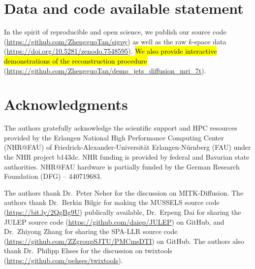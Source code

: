 \documentclass[preprint,12pt,authoryear,review]{elsarticle}
\begin{document}
    \section*{Data and code available statement}

    In the spirit of reproducible and open science,
    we publish our source code
    (\url{https://github.com/ZhengguoTan/sigpy})
    as well as the raw $k$-space data
    (\url{https://doi.org/10.5281/zenodo.7548595}).
    \hl{We also provide interactive demonstrations
    of the reconstruction procedure}
    (\url{https://github.com/ZhengguoTan/demo_jets_diffusion_mri_7t}).

    \section*{Acknowledgments}
        The authors gratefully acknowledge the scientific support and HPC resources
        provided by the Erlangen National High Performance Computing Center (NHR@FAU)
        of Friedrich-Alexander-Universit\"at Erlangen-N\"urnberg (FAU)
        under the NHR project b143dc.
        NHR funding is provided by federal and Bavarian state authorities.
        NHR@FAU hardware is partially funded by the German Research Foundation (DFG) -- 440719683.

        The authors thank Dr.~Peter Neher for the discussion on MITK-Diffusion.
        The authors thank
        Dr.~Berkin Bilgic for making the MUSSELS source code
        (\url{https://bit.ly/2QgBg9U}) publically available,
        Dr.~Erpeng Dai for sharing the JULEP source code
        (\url{https://github.com/daiep/JULEP}) on GitHub,
        and Dr.~Zhiyong Zhang for sharing the SPA-LLR source code
        (\url{https://github.com/ZZgroupSJTU/PMCmsDTI}) on GitHub.
        The authors also thank Dr.~Philipp Ehses for the discussion on
        twixtools (\url{https://github.com/pehses/twixtools}).




    
\end{document}
